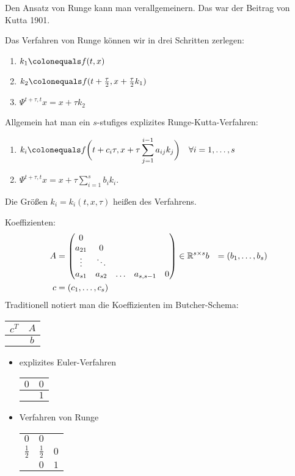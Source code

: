 Den Ansatz von Runge kann man verallgemeinern. Das war der Beitrag von Kutta 1901.

Das Verfahren von Runge können wir in drei Schritten zerlegen:
\begin{enumerate}
	\item $k_1\colonequals f(t,x)$
	\item $k_2\colonequals f (t+\frac{\tau}{2},x+\frac{\tau}{2} k_1 )$
	\item $\Psi^{t+\tau,t} x=x+\tau k_2$
\end{enumerate}
	
Allgemein hat man ein $s$-stufiges explizites Runge-Kutta-Verfahren:
\begin{enumerate}
	\item $\displaystyle k_i\colonequals f \bigg(t+c_i \tau,x+\tau \sum_{j=1}^{i-1} a_{ij}k_j \bigg)
	\quad \forall i=1,\ldots,s$
	\item $\displaystyle \Psi^{t+\tau,t} x=x+\tau \sum_{i=1}^s b_ik_i$.
\end{enumerate}

Die Größen $k_i=k_i (t,x,\tau )$ heißen  des Verfahrens.

Koeffizienten: 
\begin{align*}
	A & = 
	\begin{pmatrix}
		0 \\
		a_{21} & 0 \\
		\vdots & \ddots \\
		a_{s1} & a_{s2} & \ldots & a_{s,s-1} & 0
	\end{pmatrix} \in \mathbb R^{s \times s}
	b & = (b_1,\ldots,b_s) \\
	c & = (c_1,\ldots,c_s) \\
\end{align*}
Traditionell notiert man die Koeffizienten im Butcher-Schema:
\begin{center}
	\begin{tabular}{c|c}
		$c^T$ & $A$ \\ \hline
		 & $b$
	\end{tabular}
\end{center}

\begin{bsp}
	\begin{itemize}[leftmargin=*]
		\item explizites Euler-Verfahren 
		\begin{tabular}{c|c}
			$0$ & $0$ \\ \hline
			& $1$
		\end{tabular}
		
		\item Verfahren von Runge 
		\begin{tabular}{c|cc}
			$0$ & $0$ &  \\
			$\frac{1}{2}$ & $\frac{1}{2}$ & $0$ \\ \hline
			& $0$ & $1$
		\end{tabular}
	\end{itemize}
\end{bsp}

